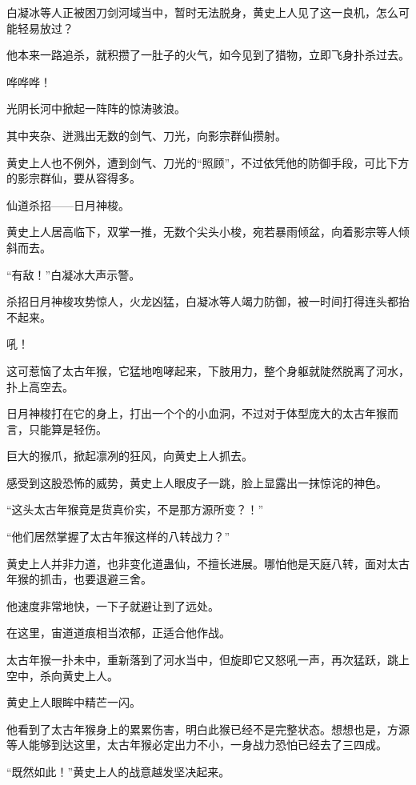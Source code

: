 
\begin{this_body}

白凝冰等人正被困刀剑河域当中，暂时无法脱身，黄史上人见了这一良机，怎么可能轻易放过？

他本来一路追杀，就积攒了一肚子的火气，如今见到了猎物，立即飞身扑杀过去。

哗哗哗！

光阴长河中掀起一阵阵的惊涛骇浪。

其中夹杂、迸溅出无数的剑气、刀光，向影宗群仙攒射。

黄史上人也不例外，遭到剑气、刀光的“照顾”，不过依凭他的防御手段，可比下方的影宗群仙，要从容得多。

仙道杀招——日月神梭。

黄史上人居高临下，双掌一推，无数个尖头小梭，宛若暴雨倾盆，向着影宗等人倾斜而去。

“有敌！”白凝冰大声示警。

杀招日月神梭攻势惊人，火龙凶猛，白凝冰等人竭力防御，被一时间打得连头都抬不起来。

吼！

这可惹恼了太古年猴，它猛地咆哮起来，下肢用力，整个身躯就陡然脱离了河水，扑上高空去。

日月神梭打在它的身上，打出一个个的小血洞，不过对于体型庞大的太古年猴而言，只能算是轻伤。

巨大的猴爪，掀起凛冽的狂风，向黄史上人抓去。

感受到这股恐怖的威势，黄史上人眼皮子一跳，脸上显露出一抹惊诧的神色。

“这头太古年猴竟是货真价实，不是那方源所变？！”

“他们居然掌握了太古年猴这样的八转战力？”

黄史上人并非力道，也非变化道蛊仙，不擅长进展。哪怕他是天庭八转，面对太古年猴的抓击，也要退避三舍。

他速度非常地快，一下子就避让到了远处。

在这里，宙道道痕相当浓郁，正适合他作战。

太古年猴一扑未中，重新落到了河水当中，但旋即它又怒吼一声，再次猛跃，跳上空中，杀向黄史上人。

黄史上人眼眸中精芒一闪。

他看到了太古年猴身上的累累伤害，明白此猴已经不是完整状态。想想也是，方源等人能够到达这里，太古年猴必定出力不小，一身战力恐怕已经去了三四成。

“既然如此！”黄史上人的战意越发坚决起来。


\end{this_body}
